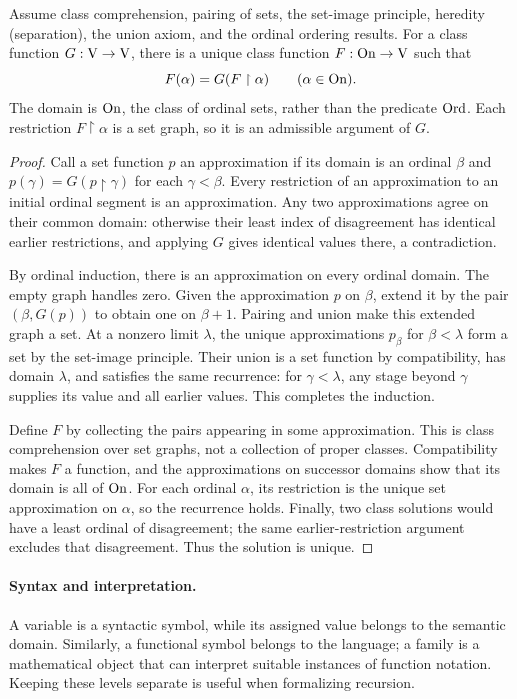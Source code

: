 \begin{theorem}
Assume class comprehension, pairing of sets, the set-image principle,
heredity (separation), the union axiom, and the ordinal ordering results. For a class function
$G:\mathrm{V}\to\mathrm{V}$, there is a unique class function $F:\mathrm{On}\to\mathrm{V}$ such that
\[
F(\alpha)=G(F\restriction\alpha)\qquad(\alpha\in\mathrm{On}).
\]
The domain is $\mathrm{On}$, the class of ordinal sets, rather than the predicate
$\mathrm{Ord}$. Each restriction $F\restriction\alpha$ is a set graph, so it is
an admissible argument of $G$.
\end{theorem}
\begin{proof}
Call a set function $p$ an approximation if its domain is an ordinal
$\beta$ and $p(\gamma)=G(p\restriction\gamma)$ for each $\gamma<\beta$.
Every restriction of an approximation to an initial ordinal segment is
an approximation. Any two
approximations agree on their common domain: otherwise their least index
of disagreement has identical earlier restrictions, and applying $G$
gives identical values there, a contradiction.

By ordinal induction, there is an approximation on every ordinal domain.
The empty graph handles zero. Given the approximation $p$ on $\beta$,
extend it by the pair $(\beta,G(p))$ to obtain one on $\beta+1$.
Pairing and union make this extended graph a set. At a nonzero limit
$\lambda$, the unique approximations $p_\beta$ for $\beta<\lambda$
form a set by the set-image principle. Their union is a set function by
compatibility, has domain $\lambda$, and satisfies the same recurrence:
for $\gamma<\lambda$, any stage beyond $\gamma$ supplies its value and
all earlier values. This completes the induction.

Define $F$ by collecting the pairs appearing in some approximation.
This is class comprehension over set graphs, not a collection of proper
classes. Compatibility makes $F$ a function, and the approximations on
successor domains show that its domain is all of $\mathrm{On}$. For each ordinal
$\alpha$, its restriction is the unique set approximation on $\alpha$,
so the recurrence holds. Finally, two class solutions would have a least
ordinal of disagreement; the same earlier-restriction argument excludes
that disagreement. Thus the solution is unique.
\end{proof}
\paragraph{Syntax and interpretation.}
A variable is a syntactic symbol, while its assigned value belongs to the
semantic domain. Similarly, a functional symbol belongs to the language;
a family is a mathematical object that can interpret suitable instances of
function notation. Keeping these levels separate is useful when formalizing
recursion.

